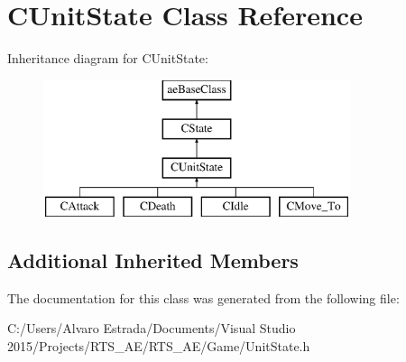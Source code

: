 \hypertarget{class_c_unit_state}{}\section{C\+Unit\+State Class Reference}
\label{class_c_unit_state}
Inheritance diagram for C\+Unit\+State\+:\begin{figure}[H]
\begin{center}
\leavevmode
\includegraphics[height=4.000000cm]{class_c_unit_state}
\end{center}
\end{figure}
\subsection*{Additional Inherited Members}


The documentation for this class was generated from the following file\+:\begin{DoxyCompactItemize}
\item 
C\+:/\+Users/\+Alvaro Estrada/\+Documents/\+Visual Studio 2015/\+Projects/\+R\+T\+S\+\_\+\+A\+E/\+R\+T\+S\+\_\+\+A\+E/\+Game/Unit\+State.\+h\end{DoxyCompactItemize}
